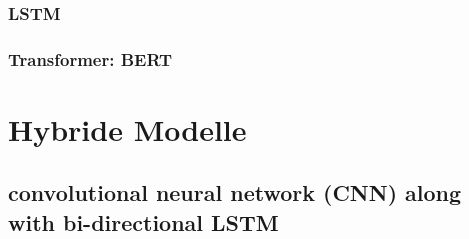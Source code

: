 \subsubsection{LSTM}

\subsubsection{Transformer: BERT}


\section{Hybride Modelle}
\label{sec:hybride_modelle}

\subsection{convolutional neural network (CNN) along with bi-directional LSTM}

\cite{Buddhadev2025}

